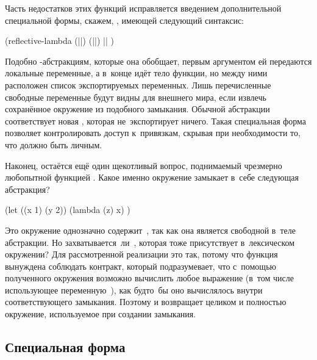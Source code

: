 Часть недостатков этих функций исправляется введением дополнительной
специальной формы, скажем, , имеющей следующий
синтаксис:

\begin{code:lisp}
(reflective-lambda (||) (||)
  || )
\end{code:lisp}

Подобно -абстракциям, которые она обобщает, первым аргументом ей
передаются локальные переменные, а в~конце идёт тело функции, но между ними
расположен список экспортируемых переменных. Лишь перечисленные свободные
переменные будут видны для внешнего мира, если извлечь сохранённое окружение
из подобного замыкания. Обычной абстракции  соответствует новая , которая не~экспортирует ничего. Такая специальная форма
позволяет контролировать доступ к~привязкам, скрывая при необходимости
то, что должно быть личным.

Наконец, остаётся ещё один щекотливый вопрос, поднимаемый чрезмерно любопытной
функцией . Какое именно окружение замыкает в~себе
следующая абстракция?

\begin{code:lisp}
(let ((x 1) (y 2))
  (lambda (z) x) )
\end{code:lisp}

{\def\H{\discretionary{}{}{}}
Это окружение однозначно содержит~, так как она является свободной в~теле
абстракции. Но захватывается~ли~, которая тоже присутствует в~лексическом
окружении? Для рассмотренной реализации это так, потому что функция
 вынуждена соблюдать контракт, который подразумевает,
что с~помощью полученного окружения возможно вычислить любое выражение (в~том
числе использующее переменную~), как будто~бы оно вычислялось внутри
соответствующего замыкания. Поэтому \ic{procedure"~>\H environment} и возвращает
целиком и полностью окружение, используемое при создании замыкания.}


\subsection{\texorpdfstring{Специальная форма \protect{}}%
{Специальная форма import}}%
\label{reflection/reify-env/ssect:import}

